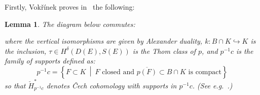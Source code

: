 \documentclass[a4paper]{amsart}
\theoremstyle{plain}
\newtheorem{lemma}[theorem]{Lemma}
\theoremstyle{definition}
\newcommand{\CCH}{\check{H}_{c}}
\begin{document}
Firstly, Vok\v{r}\'{i}nek proves in~\cite[Proposition D.1]{vokrinek_generalization_2007} the following:
\begin{lemma}\label{lemma:vokrinekcommutes}
The diagram below commutes:
\begin{center}
\end{center}
where the vertical isomorphisms are given by Alexander duality, $k \colon B \cap K \hookrightarrow K$ is the inclusion, $\tau \in H^\delta(D(E), S(E))$ is the Thom class of $p$, and $p^{-1}c$ is the family of supports defined as:
\[
    p^{-1}c = \left\{ F \subset K \ \middle| \ F \text{ closed and } \overline{p(F)} \subset B \cap K \text{ is compact} \right\}
\]
so that $\check{H}^*_{p^{-1}c}$ denotes \v{C}ech cohomology with supports in $p^{-1}c$. (See e.g.~\cite[Chapter II.2]{bredon_sheaf_1997}.)
\end{lemma}
\end{document}
